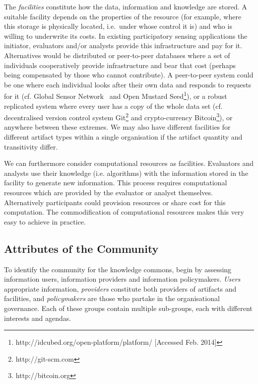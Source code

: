 The \emph{facilities} constitute how the data, information and knowledge are stored. A suitable facility depends on the properties of the resource (for example, where this storage is physically located, i.e.\ under whose control it is) and who is willing to underwrite its costs.  In existing participatory sensing applications the initiator, evaluators and/or analysts provide this infrastructure and pay for it. Alternatives would be distributed or peer-to-peer databases where a set of individuals cooperatively provide infrastructure and bear that cost (perhaps being compensated by those who cannot contribute). 
A peer-to-peer system could be one where each individual looks after their own data and responds to requests for it (cf. Global Sensor Network~\citep{Aberer2006} and Open Mustard Seed\footnote{http://idcubed.org/open-platform/platform/ [Accessed Feb. 2014]}), or a robust replicated system where every user has a copy of the whole data set (cf. decentralised version control system Git\footnote{http://git-scm.com} and crypto-currency Bitcoin\footnote{http://bitcoin.org}), or anywhere between these extremes. 
We may also have different facilities for different artifact types within a single organisation if the artifact quantity and transitivity differ.

We can furthermore consider computational resources as facilities.
Evaluators and analysts use their knowledge (i.e. algorithms) with the information stored in the facility to generate new information. This process requires computational resources which are provided by the evaluator or analyst themselves. Alternatively participants could provision resources or share cost for this computation. The commodification of computational resources makes this very easy to achieve in practice.

\subsection{Attributes of the Community}

To identify the community for the knowledge commons,  begin by assessing information users, information providers and information policymakers. 
\emph{Users} appropriate information, \emph{providers} constitute both providers of artifacts and facilities, and \emph{policymakers} are those who partake in the organisational governance. 
Each of these groups contain multiple sub-groups, each with different interests and agendas.

